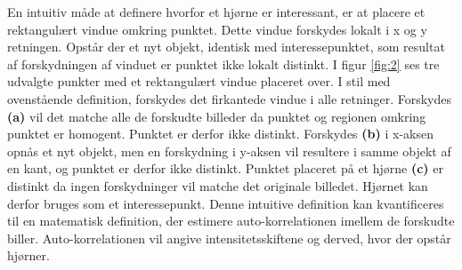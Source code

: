 En intuitiv måde at definere hvorfor et hjørne er interessant, er at placere et rektangulært vindue omkring punktet. Dette vindue forskydes lokalt i x og y retningen. Opstår der et nyt objekt, identisk med interessepunktet, som resultat af forskydningen af vinduet er punktet ikke lokalt distinkt. I figur \ref{fig:2} ses tre udvalgte punkter med et rektangulært vindue placeret over. I stil med ovenstående definition, forskydes det firkantede vindue i alle retninger. Forskydes \textbf{(a)} vil det matche alle de forskudte billeder da punktet og regionen omkring punktet er homogent. Punktet er derfor ikke distinkt. Forskydes \textbf{(b)} i x-aksen opnås et nyt objekt, men en forskydning i y-aksen vil resultere i samme objekt af en kant, og punktet er derfor ikke distinkt. Punktet placeret på et hjørne \textbf{(c)} er distinkt da ingen forskydninger vil matche det originale billedet. Hjørnet kan derfor bruges som et interessepunkt. Denne intuitive definition kan kvantificeres til en matematisk definition, der estimere auto-korrelationen imellem de forskudte biller. Auto-korrelationen vil angive intensitetsskiftene og derved, hvor der opstår hjørner. 

